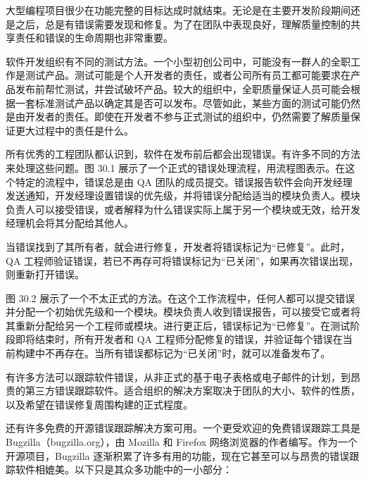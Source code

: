 
大型编程项目很少在功能完整的目标达成时就结束。无论是在主要开发阶段期间还是之后，总是有错误需要发现和修复。为了在团队中表现良好，理解质量控制的共享责任和错误的生命周期也非常重要。


软件开发组织有不同的测试方法。一个小型初创公司中，可能没有一群人的全职工作是测试产品。测试可能是个人开发者的责任，或者公司所有员工都可能要求在产品发布前帮忙测试，并尝试破坏产品。较大的组织中，全职质量保证人员可能会根据一套标准测试产品以确定其是否可以发布。尽管如此，某些方面的测试可能仍然是由开发者的责任。即使在开发者不参与正式测试的组织中，仍然需要了解质量保证更大过程中的责任是什么。


所有优秀的工程团队都认识到，软件在发布前后都会出现错误。有许多不同的方法来处理这些问题。图 30.1 展示了一个正式的错误处理流程，用流程图表示。在这个特定的流程中，错误总是由 QA 团队的成员提交。错误报告软件会向开发经理发送通知，开发经理设置错误的优先级，并将错误分配给适当的模块负责人。模块负责人可以接受错误，或者解释为什么错误实际上属于另一个模块或无效，给开发经理机会将其分配给其他人。


当错误找到了其所有者，就会进行修复，开发者将错误标记为“已修复”。此时，QA 工程师验证错误，若已不再存可将错误标记为“已关闭”，如果再次错误出现，则重新打开错误。

图 30.2 展示了一个不太正式的方法。在这个工作流程中，任何人都可以提交错误并分配一个初始优先级和一个模块。模块负责人收到错误报告，可以接受它或者将其重新分配给另一个工程师或模块。进行更正后，错误标记为“已修复”。在测试阶段即将结束时，所有开发者和 QA 工程师分配修复的错误，并验证每个错误在当前构建中不再存在。当所有错误都标记为“已关闭”时，就可以准备发布了。



有许多方法可以跟踪软件错误，从非正式的基于电子表格或电子邮件的计划，到昂贵的第三方错误跟踪软件。适合组织的解决方案取决于团队的大小、软件的性质，以及希望在错误修复周围构建的正式程度。

还有许多免费的开源错误跟踪解决方案可用。一个更受欢迎的免费错误跟踪工具是 Bugzilla（bugzilla.org），由 Mozilla 和 Firefox 网络浏览器的作者编写。作为一个开源项目，Bugzilla 逐渐积累了许多有用的功能，现在它甚至可以与昂贵的错误跟踪软件相媲美。以下只是其众多功能中的一小部分：

